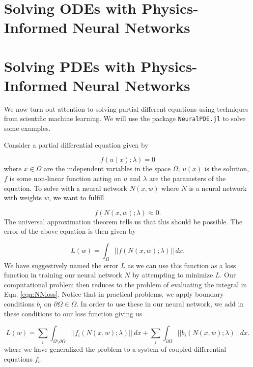 \documentclass{CUP-JNL-DTM}%
\theoremstyle{definition}
\numberwithin{equation}{section}
\begin{document}
\section{Solving ODEs with Physics-Informed Neural Networks}

\section{Solving PDEs with Physics-Informed Neural Networks}

We now turn out attention to solving partial different equations using techniques from scientific machine learning. We will use the package \texttt{NeuralPDE.jl} \cite{zubovNeuralPDEAutomatingPhysicsInformed2021} to solve some examples. 

Consider a partial differential equation given by 

\begin{equation}
	f(u(x); \lambda) = 0
\end{equation}
where $x \in \Omega$ are the independent variables in the space $\Omega$, $u(x)$ is the solution, $f$ is some non-linear function acting on $u$ and $\lambda$ are the parameters of the equation. To solve with a neural network $N(x, w)$ where $N$ is a neural network with weights $w$, we want to fulfill 

\begin{equation}
	f(N(x, w); \lambda) \approx 0.
	\label{eqn:NNapprox}
\end{equation}
The universal approximation theorem tells us that this should be possible. The error of the above equation is then given by 

\begin{equation}
	L(w) = \int_{\Omega} ||f(N(x,w); \lambda)||\,dx. 
	\label{eqn:NNloss}
\end{equation}
We have suggestively named the error $L$ as we can use this function as a loss function in training our neural network $N$ by attempting to minimize $L$. Our computational problem then reduces to the problem of evaluating the integral in Eqn. \ref{eqn:NNloss}. Notice that in practical problems, we apply boundary conditions $b_i$ on $\partial \Omega \in \Omega$. In order to use these in our neural network, we add in these conditions to our loss function giving us 

\begin{equation}
	L(w) = \sum_i\int_{\Omega\setminus\partial\Omega} ||f_i(N(x,w); \lambda)||\,dx + \sum_i\int_{\partial\Omega} ||b_i(N(x,w); \lambda)||\,dx.
	\label{eqn:complete_loss} 
\end{equation}
where we have generalized the problem to a system of coupled differential equations $f_i$. 
\end{document}
